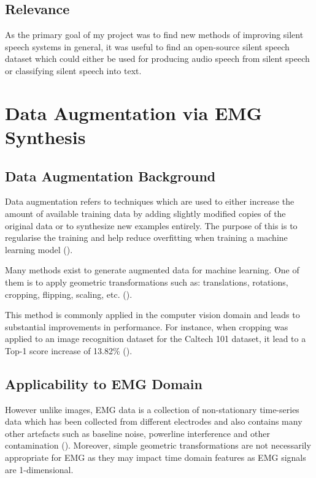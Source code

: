 \subsection{Relevance}

As the primary goal of my project was to find new methods of improving silent
speech systems in general, it was useful to find an open-source silent speech
dataset which could either be used for producing audio speech from silent
speech or classifying silent speech into text.

\section{Data Augmentation via EMG Synthesis}

\subsection{Data Augmentation Background}

Data augmentation refers to techniques which are used to either increase
the amount of available training data by adding slightly modified
copies of the original data or to synthesize new examples entirely.
The purpose of this is to regularise the training and help reduce overfitting
when training a machine learning model (\cite{data_augmentation_def}).

Many methods exist to generate augmented data for machine learning.
One of them is to apply geometric transformations such as: translations, rotations,
cropping, flipping, scaling, etc. (\cite{data_augmentation_def}).

This method is commonly applied in the computer vision domain and
leads to substantial improvements in performance. For instance,
when cropping was applied to an image recognition dataset for the
Caltech 101 dataset, it lead to a Top-1 score increase of 13.82\%
(\cite{geometric_augment}).

\subsection{Applicability to EMG Domain}

However unlike images, EMG data is a collection of non-stationary
time-series data which has been collected from different electrodes
and also contains many other artefacts such as baseline noise,
powerline interference and other contamination (\cite{semg_filtering}).
Moreover, simple geometric transformations are not necessarily appropriate
for EMG as they may impact time domain features as EMG signals are
1-dimensional.


